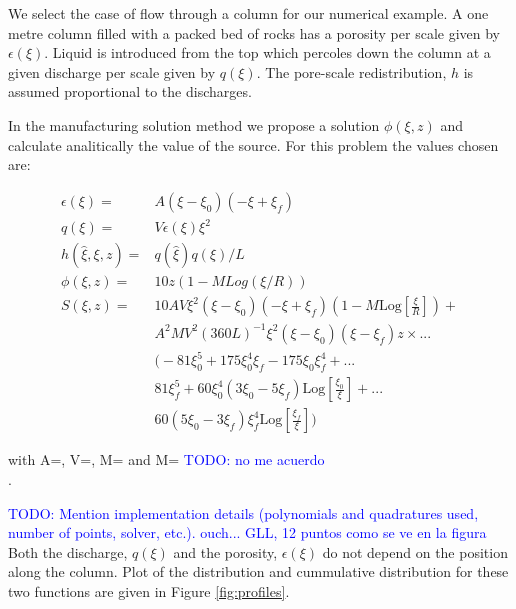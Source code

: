 \documentclass{CFD2011}
\newcommand{\TODO}[1]{\textcolor{blue}{TODO: #1} \\}
\begin{document}
We select the case of flow through a column for our numerical example. A one metre column filled with a packed bed of rocks has a porosity per scale given by $\epsilon({\xi})$. Liquid is introduced from the top which percoles down the column at a given discharge per scale given by $q({\xi})$. The pore-scale redistribution, $h$  is assumed proportional to the discharges.

In the manufacturing solution method we propose a solution $\phi(\xi, z)$ and calculate analitically the value of the source. For this problem the values chosen are:

\begin{align}
\epsilon(\xi)=&A (\xi-\xi_0) (-\xi+\xi_f) \\
q({\xi}) =&V \epsilon(\xi) \xi^2\\
h(\hat \xi, \xi, z) =& q(\hat \xi) q(\xi)/L\\
\phi(\xi, z) =& 10 z (1-M Log({\xi}/R))\\
\nonumber S(\xi, z)=& 10 A V {\xi}^2 ({\xi}-\xi_0) (-{\xi}+\xi_f) \left(1-M \text{Log}\left[\frac{{\xi}}{R}\right]\right) +\\
\nonumber  &A^2 M V^2  (360 L)^{-1} {\xi}^2 ({\xi}-\xi_0) ({\xi}-\xi_f) z \times ... \\
\nonumber  &\big(-81 \xi_0^5+175 \xi_0^4 \xi_f-175 \xi_0 \xi_f^4+  ...\\
\nonumber &81 \xi_f^5+60 \xi_0^4 (3 \xi_0-5 \xi_f) \text{Log}\left[\frac{\xi_0}{{\xi}}\right]+ ...\\
& 60 (5 \xi_0-3 \xi_f) \xi_f^4 \text{Log}\left[\frac{\xi_f}{{\xi}}\right]\big)
\end{align}

\noindent with A=, V=, M= and M= \TODO{no me acuerdo}.

\TODO{Mention implementation details (polynomials and quadratures used, number of points, solver, etc.).  ouch... GLL, 12 puntos como se ve en la figura}


Both the discharge, $q({\xi})$ and the porosity, $\epsilon({\xi})$ do not depend on the position along the column. Plot of the distribution and cummulative distribution for these two functions are given in Figure \ref{fig:profiles}.

\end{document}
